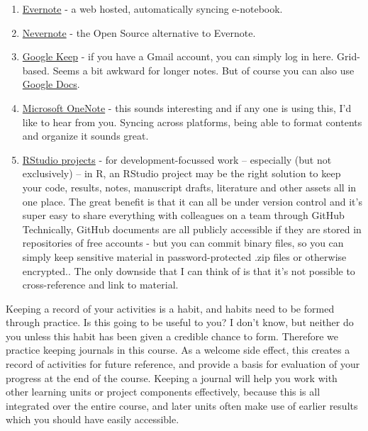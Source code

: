 \documentclass[]{book}
\providecommand{\tightlist}{%
  \setlength{\itemsep}{0pt}\setlength{\parskip}{0pt}}
\begin{document}
\begin{enumerate}
\def\labelenumi{\arabic{enumi}.}
\tightlist
\item
  \href{https://evernote.com/}{Evernote} - a web hosted, automatically
  syncing e-notebook.
\item
  \href{http://nixnote.org/}{Nevernote} - the Open Source alternative to
  Evernote.
\item
  \href{https://keep.google.com/}{Google Keep} - if you have a Gmail
  account, you can simply log in here. Grid-based. Seems a bit awkward
  for longer notes. But of course you can also use
  \href{https://drive.google.com/drive/my-drive}{Google Docs}.
\item
  \href{https://www.onenote.com/signin?wdorigin=ondc}{Microsoft OneNote}
  - this sounds interesting and if any one is using this, I'd like to
  hear from you. Syncing across platforms, being able to format contents
  and organize it sounds great.
\item
  \href{https://support.rstudio.com/hc/en-us/articles/200526207-Using-Projects}{RStudio
  projects} - for development-focussed work -- especially (but not
  exclusively) -- in R, an RStudio project may be the right solution to
  keep your code, results, notes, manuscript drafts, literature and
  other assets all in one place. The great benefit is that it can all be
  under version control and it's super easy to share everything with
  colleagues on a team through GitHub Technically, GitHub documents are
  all publicly accessible if they are stored in repositories of free
  accounts - but you can commit binary files, so you can simply keep
  sensitive material in password-protected .zip files or otherwise
  encrypted.. The only downside that I can think of is that it's not
  possible to cross-reference and link to material.
\end{enumerate}

Keeping a record of your activities is a habit, and habits need to be
formed through practice. Is this going to be useful to you? I don't
know, but neither do you unless this habit has been given a credible
chance to form. Therefore we practice keeping journals in this course.
As a welcome side effect, this creates a record of activities for future
reference, and provide a basis for evaluation of your progress at the
end of the course. Keeping a journal will help you work with other
learning units or project components effectively, because this is all
integrated over the entire course, and later units often make use of
earlier results which you should have easily accessible.
\end{document}
